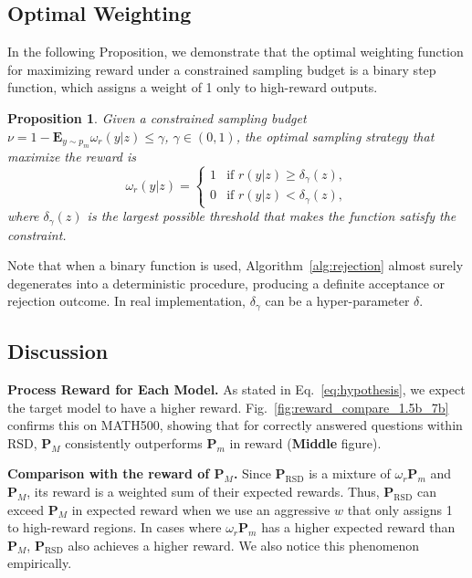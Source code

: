 \documentclass{article}
\theoremstyle{plain}
\newtheorem{proposition}[theorem]{Proposition}
\theoremstyle{definition}
\theoremstyle{remark}
\begin{document}
\subsection{Optimal Weighting}

In the following Proposition, we demonstrate that the optimal weighting function for maximizing reward under a constrained sampling budget is a binary step function, which assigns a weight of 
1 only to high-reward outputs.

\begin{proposition} \label{prop:optimal}
Given a constrained sampling budget $\nu=1-\mathbf{E}_{y\sim p_m} \omega_r(y|z) \leq  \gamma$, $\gamma\in(0,1)$, the optimal sampling strategy that maximize the reward is
\begin{equation}
    \omega_r(y|z) =
\begin{cases} 
1 & \text{if } r(y|z) \geq \delta_{\gamma}(z), \\
0 & \text{if } r(y|z) < \delta_{\gamma}(z),
\end{cases}
\end{equation}
where $\delta_{\gamma}(z)$ is the largest possible threshold that makes the function satisfy the constraint.
\end{proposition}

Note that when a binary function is used, Algorithm~\ref{alg:rejection} almost surely degenerates into a deterministic procedure, producing a definite acceptance or rejection outcome. In real implementation, $\delta_{\gamma}$ can be a hyper-parameter $\delta$.


\subsection{Discussion}





\textbf{Process Reward for Each Model.} As stated in Eq.~\eqref{eq:hypothesis}, we expect the target model to have a higher reward. Fig.~\ref{fig:reward_compare_1.5b_7b} confirms this on MATH500, showing that for correctly answered questions within RSD, \(\mathbf{P}_M\) consistently outperforms \(\mathbf{P}_m\) in reward (\textbf{Middle} figure).

\textbf{Comparison with the reward of \(\mathbf{P}_M\).} Since \(\mathbf{P}_{\text{RSD}}\) is a mixture of \(\omega_r \mathbf{P}_m\) and \(\mathbf{P}_M\), its reward is a weighted sum of their expected rewards. Thus, \(\mathbf{P}_{\text{RSD}}\) can exceed \(\mathbf{P}_M\) in expected reward when we use an aggressive $w$ that only assigns 1 to high-reward regions. In cases where \(\omega_r \mathbf{P}_m\) has a higher expected reward than \(\mathbf{P}_M\), \(\mathbf{P}_{\text{RSD}}\) also achieves a higher reward. We also notice this phenomenon empirically.
\end{document}
